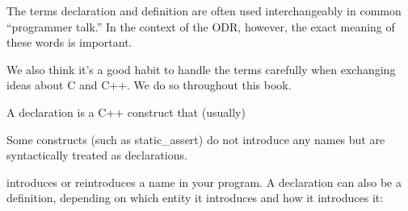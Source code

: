 The terms declaration and definition are often used interchangeably in common “programmer talk.” In the context of the ODR, however, the exact meaning of these words is important.

\begin{tcolorbox}[colback=webgreen!5!white,colframe=webgreen!75!black]
\hspace*{0.75cm}We also think it’s a good habit to handle the terms carefully when exchanging ideas about C and C++. We do so throughout this book.
\end{tcolorbox}

A declaration is a C++ construct that (usually)

\begin{tcolorbox}[colback=webgreen!5!white,colframe=webgreen!75!black]
\hspace*{0.75cm}Some constructs (such as static\_assert) do not introduce any names but are syntactically treated as declarations.
\end{tcolorbox}

introduces or reintroduces a name in your program. A declaration can also be a definition, depending on which entity it introduces and how it introduces it:

